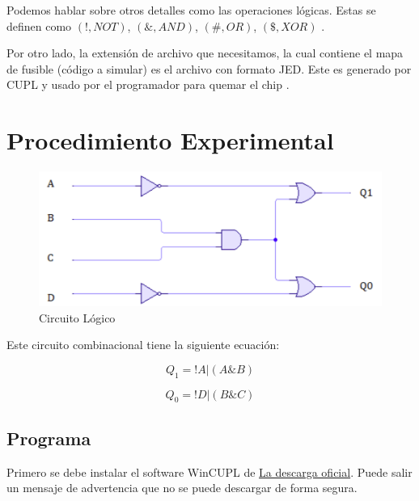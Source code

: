 \documentclass{article}
\begin{document}
    Podemos hablar sobre otros detalles como las operaciones lógicas. Estas se definen como $(!, NOT)$, $(\&, AND)$, $(\#, OR)$, $(\$, XOR)$ \cite{warneke-1998}.

    \bigbreak

    Por otro lado, la extensión de archivo que necesitamos, la cual contiene el mapa de fusible (código a simular) es el archivo con formato JED. Este es generado por CUPL y usado por el programador para quemar el chip \cite{warneke-1998}.

    \section{Procedimiento Experimental}\label{sec:procedimiento-experimental}



    \begin{figure}[H]
        \centering
        \includegraphics[width=0.5\paperwidth]{images/logic-circuit}
        \caption{Circuito Lógico}
    \end{figure}

    Este circuito combinacional tiene la siguiente ecuación:

    $$Q_1 = !A | (A \& B)$$

    $$Q_0 = !D | (B \& C)$$

    \subsection{Programa}

    Primero se debe instalar el software WinCUPL de \href{https://www.microchip.com/en-us/products/fpgas-and-plds/spld-cplds/pld-design-resources}{La descarga oficial}. Puede salir un mensaje de advertencia que no se puede descargar de forma segura.
\end{document}
